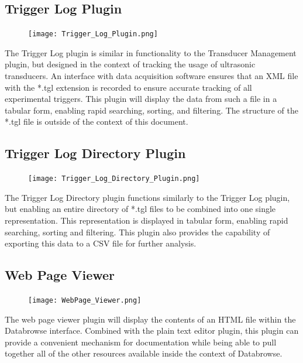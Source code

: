 \documentclass[10pt]{article}
\begin{document}
\endgroup

\hfill \break
\hfill \break


\begingroup
\setlength\intextsep{0pt}
\subsection{Trigger Log Plugin}
\begin{figure}
		\texttt{[image: Trigger\_Log\_Plugin.png]}
\end{figure}
The Trigger Log plugin is similar in functionality to the Transducer Management plugin, but designed in the context of tracking the usage of ultrasonic transducers.  An interface with data acquisition software ensures that an XML file with the *.tgl extension is recorded to ensure accurate tracking of all experimental triggers.  This plugin will display the data from such a file in a tabular form, enabling rapid searching, sorting, and filtering.  The structure of the *.tgl file is outside of the context of this document.

\endgroup



\begingroup
\setlength\intextsep{0pt}
\subsection{Trigger Log Directory Plugin}
\begin{figure}
		\texttt{[image: Trigger\_Log\_Directory\_Plugin.png]}
\end{figure}
The Trigger Log Directory plugin functions similarly to the Trigger Log plugin, but enabling an entire directory of *.tgl files to be combined into one single representation.  This representation is displayed in tabular form, enabling rapid searching, sorting and filtering.  This plugin also provides the capability of exporting this data to a CSV file for further analysis.

\endgroup


\clearpage
\begingroup
\setlength\intextsep{0pt}
\subsection{Web Page Viewer}
\begin{figure}
		\texttt{[image: WebPage\_Viewer.png]}
\end{figure}
The web page viewer plugin will display the contents of an HTML file within the Databrowse interface.  Combined with the plain text editor plugin, this plugin can provide a convenient mechanism for documentation while being able to pull together all of the other resources available inside the context of Databrowse.
\end{document}
